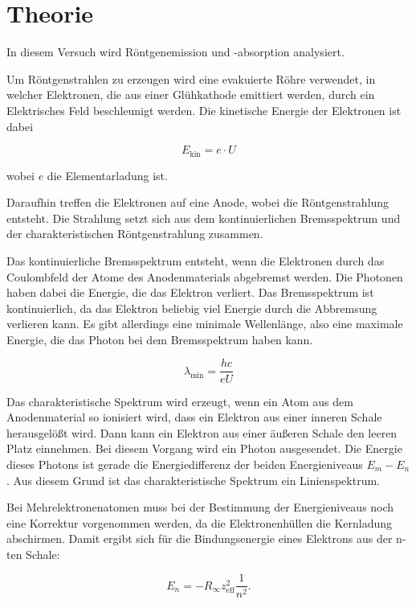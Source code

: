 \section{Theorie}

In diesem Versuch wird Röntgenemission und -absorption analysiert.

Um Röntgenstrahlen zu erzeugen wird eine evakuierte Röhre verwendet, in welcher
Elektronen, die aus einer Glühkathode emittiert werden, durch ein Elektrisches
Feld beschleunigt werden. Die kinetische Energie der Elektronen ist dabei

\begin{equation*}
  E_\text{kin} = e \cdot U
\end{equation*}

wobei $e$ die Elementarladung ist.

Daraufhin treffen die Elektronen auf eine Anode, wobei die Röntgenstrahlung
entsteht. Die Strahlung setzt sich aus dem kontinuierlichen Bremsspektrum und
der charakteristischen Röntgenstrahlung zusammen.

Das kontinuierliche Bremsspektrum entsteht, wenn die Elektronen durch das Coulombfeld
der Atome des Anodenmaterials abgebremst werden. Die Photonen haben dabei die Energie,
die das Elektron verliert. Das Bremsspektrum ist kontinuierlich, da das Elektron
beliebig viel Energie durch die Abbremsung verlieren kann. Es gibt allerdings
eine minimale Wellenlänge, also eine maximale Energie,
die das Photon bei dem Bremsspektrum haben kann.

\begin{equation}
  \lambda_\text{min} = \frac{hc}{eU}
  \label{eq:1}
\end{equation}

Das charakteristische Spektrum wird erzeugt, wenn ein Atom aus dem Anodenmaterial
so ionisiert wird, dass ein Elektron aus einer inneren Schale herausgelößt wird.
Dann kann ein Elektron aus einer äußeren Schale den leeren Platz einnehmen. Bei
diesem Vorgang wird ein Photon ausgesendet. Die Energie dieses Photons ist gerade
die Energiedifferenz der beiden Energieniveaus $E_m - E_n$. Aus diesem Grund ist das
charakteristische Spektrum ein Linienspektrum.

Bei Mehrelektronenatomen muss bei der Bestimmung der Energieniveaus noch eine
Korrektur vorgenommen werden, da die Elektronenhüllen die Kernladung abschirmen.
Damit ergibt sich für die Bindungsenergie eines Elektrons aus der n-ten Schale:

\begin{equation}
  E_n = - R_\infty z_\text{eff}^2 \frac{1}{n^2}.
  \label{eq:2}
\end{equation}

